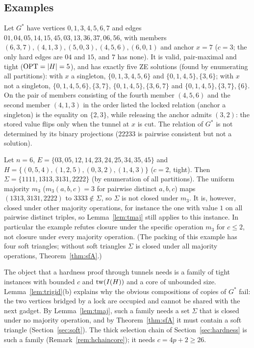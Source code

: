 \subsection{Examples}
\begin{example}\label{ex:gstar}
Let $G^*$ have vertices $0,1,3,4,5,6,7$ and edges $01,\allowbreak 04,\allowbreak 05,\allowbreak 14,\allowbreak 15,\allowbreak 45,\allowbreak 03,\allowbreak 13,\allowbreak 36,\allowbreak 37,\allowbreak 06,\allowbreak 56$, with members $(6,3,7),(4,1,3),(5,0,3),(4,5,6),(6,0,1)$ and anchor $x=7$ ($c=3$; the only hard edges are $04$ and $15$, and $7$ has none). It is valid, pair-maximal and tight ($\mathrm{OPT}=|H|=5$), and has exactly five ZE solutions (found by enumerating all partitions): with $x$ a singleton, $\{0,1,3,4,5,6\}$ and $\{0,1,4,5\},\{3,6\}$; with $x$ not a singleton, $\{0,1,4,5,6\},\{3,7\}$, $\{0,1,4,5\},\{3,6,7\}$ and $\{0,1,4,5\},\{3,7\},\{6\}$. On the pair of members consisting of the fourth member $(4,5,6)$ and the second member $(4,1,3)$ in the order listed the locked relation (anchor a singleton) is the equality on $\{2,3\}$, while releasing the anchor admits $(3,2)$: the stored value flips only when the tunnel at $x$ is cut. The relation of $G^*$ is not determined by its binary projections ($22233$ is pairwise consistent but not a solution).
\end{example}
\begin{example}\label{ex:maj}
Let $n=6$, $E=\{03,\allowbreak 05,\allowbreak 12,\allowbreak 14,\allowbreak 23,\allowbreak 24,\allowbreak 25,\allowbreak 34,\allowbreak 35,\allowbreak 45\}$ and $H=\{(0,5,4),(1,2,5),(0,3,2),(1,4,3)\}$ ($c=2$, tight). Then $\Sigma=\{1111,1313,3131,2222\}$ (by enumeration of all partitions). The uniform majority $m_3$ ($m_3(a,b,c)=3$ for pairwise distinct $a,b,c$) maps $(1313,3131,2222)$ to $3333\notin\Sigma$, so $\Sigma$ is not closed under $m_3$. It is, however, closed under other majority operations, for instance the one with value $1$ on all pairwise distinct triples, so Lemma~\ref{lem:tmaj} still applies to this instance. In particular the example refutes closure under the specific operation $m_3$ for $c\le2$, not closure under every majority operation. (The packing of this example has four soft triangles; without soft triangles $\Sigma$ is closed under all majority operations, Theorem~\ref{thm:sfA}.)
\end{example}
The object that a hardness proof through tunnels needs is a family of tight instances with bounded $c$ and $\mathrm{tw}(I(H))$ and a core of unbounded size. Lemma~\ref{lem:trigid}(b) explains why the obvious compositions of copies of $G^*$ fail: the two vertices bridged by a lock are occupied and cannot be shared with the next gadget. By Lemma~\ref{lem:tmaj}, such a family needs a set $\Sigma$ that is closed under no majority operation, and by Theorem~\ref{thm:sfA} it must contain a soft triangle (Section~\ref{sec:soft}). The thick selection chain of Section~\ref{sec:hardness} is such a family (Remark~\ref{rem:hchaincore}); it needs $c=4p+2\ge26$.
